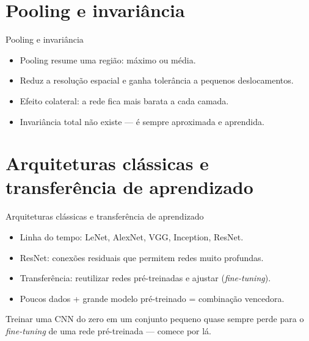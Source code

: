 \documentclass[aspectratio=169, 11pt]{beamer}
\begin{document}
\section{Pooling e invariância}

\begin{frame}{Pooling e invariância}
  \begin{itemize}\setlength{\itemsep}{0.4ex}
    \item Pooling resume uma região: máximo ou média.
    \item Reduz a resolução espacial e ganha tolerância a pequenos deslocamentos.
    \item Efeito colateral: a rede fica mais barata a cada camada.
    \item Invariância total não existe — é sempre aproximada e aprendida.
  \end{itemize}
\end{frame}

\section{Arquiteturas clássicas e transferência de aprendizado}

\begin{frame}{Arquiteturas clássicas e transferência de aprendizado}
  \begin{itemize}\setlength{\itemsep}{0.4ex}
    \item Linha do tempo: LeNet, AlexNet, VGG, Inception, ResNet.
    \item ResNet: conexões residuais que permitem redes muito profundas.
    \item Transferência: reutilizar redes pré-treinadas e ajustar
          (\emph{fine-tuning}).
    \item Poucos dados + grande modelo pré-treinado = combinação vencedora.
  \end{itemize}
  \begin{alertabox}
    Treinar uma CNN do zero em um conjunto pequeno quase sempre perde para
    o \emph{fine-tuning} de uma rede pré-treinada — comece por lá.
  \end{alertabox}
\end{frame}
\end{document}
